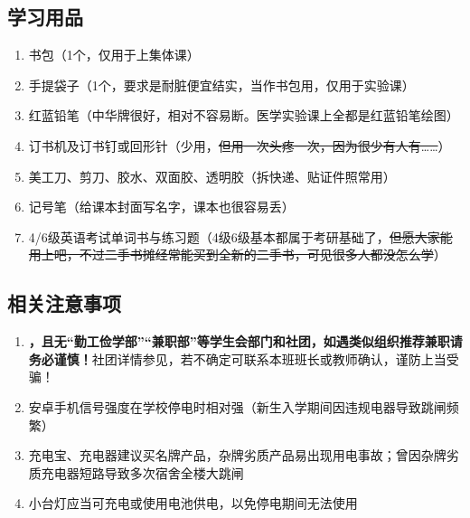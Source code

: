 \subsection[学习用品]{学习用品}
\begin{enumerate}
    \item 书包（1个，仅用于上集体课）
    \item 手提袋子（1个，要求是耐脏便宜结实，当作书包用，仅用于实验课\footnotemark）
    \item 红蓝铅笔（中华牌很好，相对不容易断。医学实验课上全都是红蓝铅笔绘图）
    \item 订书机及订书钉或回形针（少用，\st{但用一次头疼一次，因为很少有人有……}）
    \item 美工刀、剪刀、胶水、双面胶、透明胶（拆快递、贴证件照常用）
    \item 记号笔（给课本封面写名字，课本也很容易丢）
    \item 4/6级英语考试单词书与练习题（4级6级基本都属于考研基础了，\st{但愿大家能用上吧，不过\linebreak[3]二手书摊经常能买到全新的二手书，可见很多人都没怎么学}）
\end{enumerate}

\subsection[相关注意事项]{相关注意事项}
\begin{enumerate}
    \item \textbf{，且无“勤工俭学部”“兼职部”等学生会部门和社团，如遇类似组织推荐兼职请务必谨慎！}社团详情参见，若不确定可联系本班班长或教师确认，谨防上当受骗！
    \item 安卓手机信号强度在学校停电时相对强（新生入学期间因违规电器导致跳闸频繁）
    \item 充电宝、充电器建议买名牌产品，杂牌劣质产品易出现用电事故；曾因杂牌劣质充电器短路导致多次宿舍全楼大跳闸
    \item 小台灯应当可充电或使用电池供电，以免停电期间无法使用
\end{enumerate}